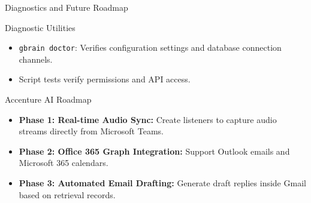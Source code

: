\documentclass[10pt]{beamer}
\begin{document}
\begin{frame}{Diagnostics and Future Roadmap}
  \begin{block}{Diagnostic Utilities}
    \begin{itemize}
      \item \texttt{gbrain doctor}: Verifies configuration settings and database connection channels.
      \item Script tests verify permissions and API access.
    \end{itemize}
  \end{block}
  \begin{block}{Accenture AI Roadmap}
    \begin{itemize}
      \item \textbf{Phase 1: Real-time Audio Sync:} Create listeners to capture audio streams directly from Microsoft Teams.
      \item \textbf{Phase 2: Office 365 Graph Integration:} Support Outlook emails and Microsoft 365 calendars.
      \item \textbf{Phase 3: Automated Email Drafting:} Generate draft replies inside Gmail based on retrieval records.
    \end{itemize}
  \end{block}
\end{frame}
\end{document}
